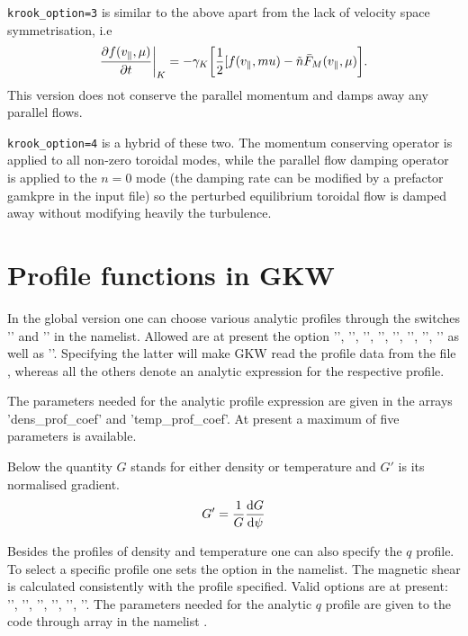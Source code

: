 \texttt{krook_option=3} is similar to the above apart from the lack of velocity space symmetrisation, i.e
\begin{equation}
\frac{\partial  f (v_\parallel,\mu)}{\partial  t} \biggr \vert_{K}  = - \gamma_K \biggl [   
\frac{1 }{ 2} [ f(v_\parallel,mu)  -  \tilde n \bar F_M(v_\parallel,\mu) \biggr ]. 
\end{equation}
This version does not conserve the parallel momentum and damps away any parallel flows.

\texttt{krook_option=4} is a hybrid of these two.  The momentum conserving operator is applied to all non-zero toroidal modes, while the parallel flow damping operator is applied to the $n=0$ mode (the damping rate can be modified by a prefactor gamkpre in the input file) so the perturbed equilibrium toroidal flow is damped away without modifying heavily the turbulence.

\section{Profile functions in GKW}
\label{secprofilefunctions}
In the global version one can choose various analytic profiles through the 
switches '' and '' in the 
 namelist. Allowed are at 
present the option '', '', '', 
'', '', '', '', '' as well as ''. 
Specifying the latter will make GKW read the profile data from the file , whereas all the others denote an analytic expression for the respective profile.

The parameters needed for the analytic profile expression are given 
in the arrays 'dens_prof_coef' and 'temp_prof_coef'. At present a maximum 
of five parameters is available. 

Below the quantity $G$ stands for either density or temperature and $G'$ is its normalised gradient.
\begin{equation}
G' = \frac{1 }{ G} \frac{\mathrm{d}  G }{\mathrm{d}  \psi} 
\end{equation}

Besides the profiles of density and temperature one can also specify the 
$q$ profile. To select a specific profile one sets the  
option in the  namelist. The magnetic shear is calculated 
consistently with the profile specified. Valid options are at present: 
'', '', '', '', 
'', ''. The parameters needed for the analytic $q$ 
profile are given to the code through  array in the namelist .

